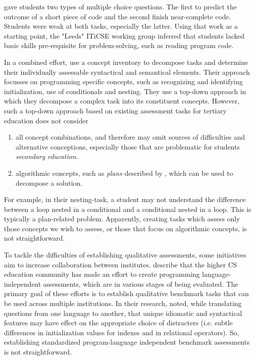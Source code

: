  gave students two types of multiple choice questions. The first to predict the outcome of a short piece of code and the second finish near-complete code. Students were weak at both tasks, especially the latter. Using that work as a starting point, the "Leeds" ITiCSE working group inferred that students lacked basic skills pre-requisite for problem-solving, such as reading program code. 



In a combined effort,  use a concept inventory to decompose tasks and determine their individually assessable syntactical and semantical elements. Their approach focusses on programming specific concepts, such as recognizing and identifying initialization, use of conditionals and nesting. They use a top-down approach in which they decompose a complex task into its constituent concepts.  However, such a top-down approach based on existing assessment tasks for tertiary education does not consider 
\begin{enumerate}
\item all concept combinations, and therefore may omit sources of difficulties and alternative conceptions, especially those that are problematic for students \emph{secondary education}.
\item algorithmic concepts, such as \emph{plans} described by , which can be used to decompose a solution.
\end{enumerate}


For example, in their nesting-task, a student may not understand the difference between a loop nested in a conditional and a conditional nested in a loop. This is typically a plan-related problem. Apparently, creating tasks which assess only those concepts we wish to assess, or those that focus on algorithmic concepts, is not straightforward.


To tackle the difficulties of establishing qualitative assessments, some initiatives aim to increase collaboration between institutes.  describe that the higher CS education community has made an effort to create programming language-independent assessments, which are in various stages of being evaluated. The primary goal of these efforts is to establish qualitative benchmark tasks that can be used across multiple institutions. In their research,  noted, while translating questions from one language to another, that unique idiomatic and syntactical features may have effect on the appropriate choice of distracters (i.e. subtle differences in initialization values for indexes and in relational operators). So, establishing standardized program-language independent benchmark assessments is not straightforward.


